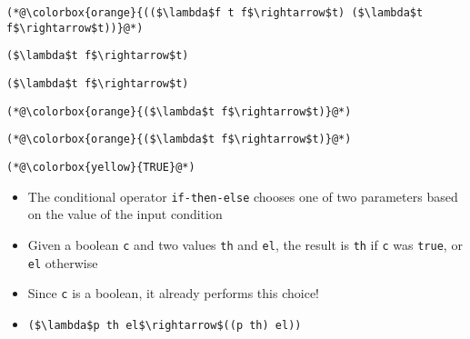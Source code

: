 \documentclass{beamer}
\begin{document}
\begin{frame}[fragile]{\CurrentSection}
\lstset{basicstyle=\ttfamily\small}\lstset{numbers=none}\lstset{language=ML}\begin{lstlisting}
(*@\colorbox{orange}{(($\lambda$f t f$\rightarrow$t) ($\lambda$t f$\rightarrow$t))}@*)
\end{lstlisting}
\pause\lstset{language=ML}\begin{lstlisting}
($\lambda$t f$\rightarrow$t)
\end{lstlisting}

\end{frame}

\begin{frame}[fragile]{\CurrentSection}
\lstset{basicstyle=\ttfamily\small}\lstset{numbers=none}\lstset{language=ML}\begin{lstlisting}
($\lambda$t f$\rightarrow$t)
\end{lstlisting}
\pause\lstset{language=ML}\begin{lstlisting}
(*@\colorbox{orange}{($\lambda$t f$\rightarrow$t)}@*)
\end{lstlisting}

\end{frame}

\begin{frame}[fragile]{\CurrentSection}
\lstset{basicstyle=\ttfamily\small}\lstset{numbers=none}\lstset{language=ML}\begin{lstlisting}
(*@\colorbox{orange}{($\lambda$t f$\rightarrow$t)}@*)
\end{lstlisting}
\pause\lstset{language=ML}\begin{lstlisting}
(*@\colorbox{yellow}{TRUE}@*)
\end{lstlisting}

\end{frame}

\begin{frame}[fragile]{\CurrentSection}
\begin{block}{\CurrentSubSection}
\begin{itemize}
\item The conditional operator \texttt{if-then-else} chooses one of two parameters based on the value of the input condition
\item Given a boolean \texttt{c} and two values \texttt{th} and \texttt{el}, the result is \texttt{th} if \texttt{c} was \texttt{true}, or \texttt{el} otherwise
\item Since \texttt{c} is a boolean, it already performs this choice!
\item \lstset{basicstyle=\ttfamily\small}\lstset{numbers=none}\lstset{language=ML}\begin{lstlisting}
($\lambda$p th el$\rightarrow$((p th) el))
\end{lstlisting}


\end{itemize}

\end{block}


\end{frame}
\end{document}
